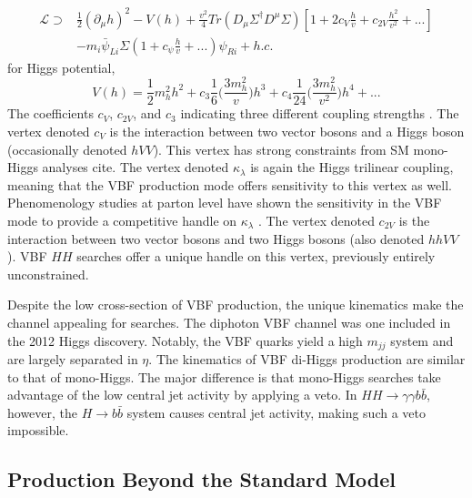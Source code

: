 \begin{equation}
    \begin{aligned}
    \mathcal{L} \supset &\frac{1}{2}(\partial_{\mu} h)^2 -V(h) + \frac{v^2}{4} Tr(D_{\mu}\Sigma^\dagger D^\mu \Sigma) [1 + 2c_{V} \frac{h}{v} + c_{2V} \frac{h^2}{v^2} + ...] \\
     &- m_i\bar{\psi}_{Li}\Sigma(1+c_{\psi}\frac{h}{v}+...)\psi_{Ri} + h.c.
    \end{aligned}
\end{equation}
for Higgs potential,
\begin{equation}
    V(h) = \frac{1}{2}m_h^2h^2 +c_3 \frac{1}{6}\bigg(\frac{3m_h^2}{v}\bigg)h^3 + c_4 \frac{1}{24}\bigg(\frac{3m_h^2}{v^2}\bigg)h^4+...
\end{equation}
The coefficients $c_V$, $c_{2V}$, and $c_3$ indicating three different coupling strengths \cite{vbfhh}. The vertex denoted $c_V$ is the interaction between two vector bosons and a Higgs boson (occasionally denoted $hVV$). This vertex has strong constraints from \gls{SM} mono-Higgs analyses {\color{red} cite}. The vertex denoted $\kappa_{\lambda}$ is again the Higgs trilinear coupling, meaning that the \gls{VBF} production mode offers sensitivity to this vertex as well. Phenomenology studies at parton level have shown the sensitivity in the \gls{VBF} mode to provide a competitive handle on $\kappa_{\lambda}$ \cite{vbf_lambda}. The vertex denoted $c_{2V}$ is the interaction between two vector bosons and two Higgs bosons (also denoted $hhVV$). \gls{VBF} $HH$ searches offer a unique handle on this vertex, previously entirely unconstrained.

Despite the low cross-section of \gls{VBF} production, the unique kinematics make the channel appealing for searches. The diphoton \gls{VBF} channel was one included in the 2012 Higgs discovery. Notably, the \gls{VBF} quarks yield a high $m_{jj}$ system and are largely separated in $\eta$. The kinematics of \gls{VBF} di-Higgs production are similar to that of mono-Higgs. The major difference is that mono-Higgs searches take advantage of the low central jet activity by applying a veto. In $HH \rightarrow \gamma \gamma b\bar{b}$, however, the $H \rightarrow b\bar{b}$ system causes central jet activity, making such a veto impossible.


\subsection{Production Beyond the Standard Model}

